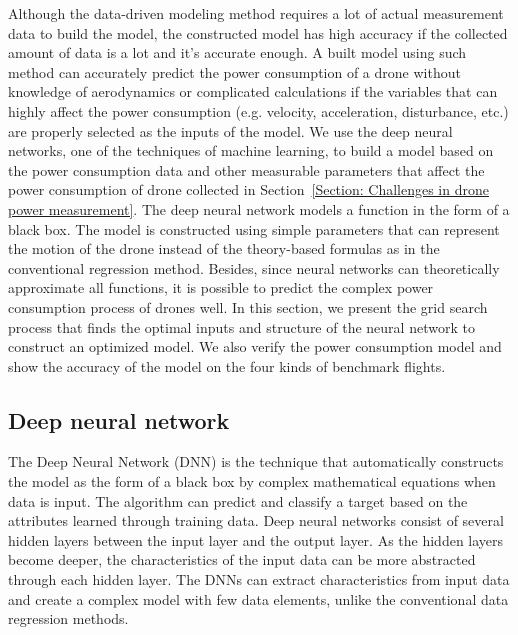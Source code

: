 \documentclass[journal]{./template/IEEEtran}
\begin{document}
Although the data-driven modeling method requires a lot of actual measurement data to build the model, the constructed model has high accuracy if the collected amount of data is a lot and it's accurate enough.
A built model using such method can accurately predict the power consumption of a drone without knowledge of aerodynamics or complicated calculations if the variables that can highly affect the power consumption (e.g. velocity, acceleration, disturbance, etc.) are properly selected as the inputs of the model.
We use the deep neural networks, one of the techniques of machine learning, to build a model based on the power consumption data and other measurable parameters that affect the power consumption of drone collected in Section~\ref{Section: Challenges in drone power measurement}.
The deep neural network models a function in the form of a black box. The model is constructed using simple parameters that can represent the motion of the drone instead of the theory-based formulas as in the conventional regression method. 
Besides, since neural networks can theoretically approximate all functions, it is possible to predict the complex power consumption process of drones well.
In this section, we present the grid search process that finds the optimal inputs and structure of the neural network to construct an optimized model. 
We also verify the power consumption model and show the accuracy of the model on the four kinds of benchmark flights.





\subsection{Deep neural network}

The Deep Neural Network (DNN) is the technique that automatically constructs the model as the form of a black box by complex mathematical equations when data is input.
The algorithm can predict and classify a target based on the attributes learned through training data. 
Deep neural networks consist of several hidden layers between the input layer and the output layer.
As the hidden layers become deeper, the characteristics of the input data can be more abstracted through each hidden layer.
The DNNs can extract characteristics from input data and create a complex model with few data elements, unlike the conventional data regression methods.
\end{document}
